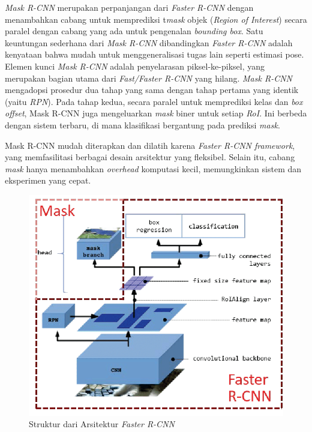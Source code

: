 \textit{Mask R-CNN} merupakan perpanjangan dari \textit{Faster R-CNN} dengan menambahkan cabang untuk memprediksi t\textit{mask} objek (\textit{Region of Interest}) secara paralel dengan cabang yang ada untuk pengenalan \textit{bounding box}. Satu keuntungan sederhana dari \textit{Mask R-CNN} dibandingkan \textit{Faster R-CNN} adalah kenyataan bahwa mudah untuk menggeneralisasi tugas lain seperti estimasi pose. Elemen kunci \textit{Mask R-CNN} adalah penyelarasan piksel-ke-piksel, yang merupakan bagian utama dari \textit{Fast/Faster R-CNN} yang hilang. \textit{Mask R-CNN} mengadopsi prosedur dua tahap yang sama dengan tahap pertama yang identik (yaitu \textit{RPN}). Pada tahap kedua, secara paralel untuk memprediksi kelas dan \textit{box offset}, Mask R-CNN juga mengeluarkan \textit{mask} biner untuk setiap \textit{RoI}. Ini berbeda dengan sistem terbaru, di mana klasifikasi bergantung pada prediksi \textit{mask}.

Mask R-CNN mudah diterapkan dan dilatih karena \textit{Faster R-CNN framework}, yang memfasilitasi berbagai desain arsitektur yang fleksibel. Selain itu, cabang \textit{mask} hanya menambahkan \textit{overhead} komputasi kecil, memungkinkan sistem dan eksperimen yang cepat.

\begin{figure}[H]
	\centering
	\includegraphics[scale=0.25]{gambar/arch-mask-rcnn.png}
	\caption{Struktur dari Arsitektur \textit{Faster R-CNN} \citep{arch-mask-rcnn}}
	\label{fig:mask-rcnn}
\end{figure}

